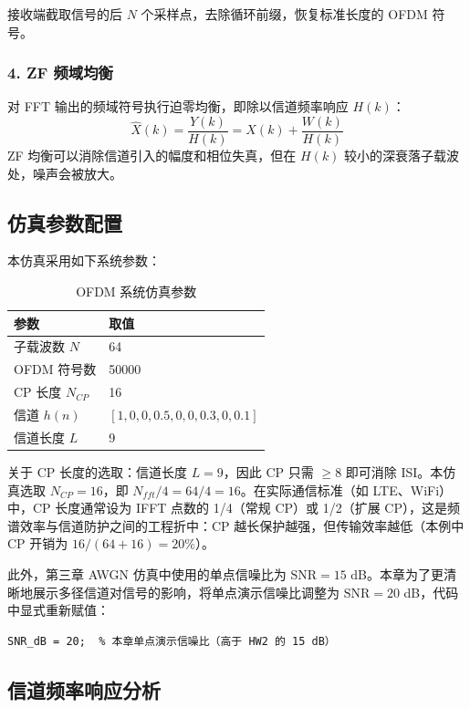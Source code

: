 \documentclass[a4paper, 11pt]{ctexart}
\begin{document}
接收端截取信号的后 $N$ 个采样点，去除循环前缀，恢复标准长度的 OFDM 符号。

\subsubsection{4. ZF 频域均衡}

对 FFT 输出的频域符号执行迫零均衡，即除以信道频率响应 $H(k)$：
\begin{equation}
    \hat{X}(k) = \frac{Y(k)}{H(k)} = X(k) + \frac{W(k)}{H(k)}
\end{equation}
ZF 均衡可以消除信道引入的幅度和相位失真，但在 $H(k)$ 较小的深衰落子载波处，噪声会被放大。

\subsection{仿真参数配置}

本仿真采用如下系统参数：

\begin{table}[H]
\centering
\begin{tabular}{ll}
\toprule
参数 & 取值 \\
\midrule
子载波数 $N$ & 64 \\
OFDM 符号数 & 50000 \\
CP 长度 $N_{CP}$ & 16 \\
信道 $h(n)$ & $[1, 0, 0, 0.5, 0, 0, 0.3, 0, 0.1]$ \\
信道长度 $L$ & 9 \\
\bottomrule
\end{tabular}
\caption{OFDM 系统仿真参数}
\end{table}

关于 CP 长度的选取：信道长度 $L = 9$，因此 CP 只需 $\ge 8$ 即可消除 ISI。本仿真选取 $N_{CP} = 16$，即 $N_{fft}/4 = 64/4 = 16$。在实际通信标准（如 LTE、WiFi）中，CP 长度通常设为 IFFT 点数的 1/4（常规 CP）或 1/2（扩展 CP），这是频谱效率与信道防护之间的工程折中：CP 越长保护越强，但传输效率越低（本例中 CP 开销为 $16/(64+16) = 20\%$）。

此外，第三章 AWGN 仿真中使用的单点信噪比为 $\text{SNR} = 15$ dB。本章为了更清晰地展示多径信道对信号的影响，将单点演示信噪比调整为 $\text{SNR} = 20$ dB，代码中显式重新赋值：

\begin{lstlisting}[caption={本章 SNR 参数设置}]
SNR_dB = 20;  % 本章单点演示信噪比（高于 HW2 的 15 dB）
\end{lstlisting}

\subsection{信道频率响应分析}
\end{document}
